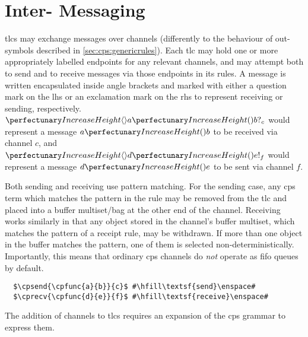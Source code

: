 \section{\label{sec:cps:intertlcmess}Inter- Messaging}

\Glspl{tlc} may exchange messages over channels (differently to the behaviour of out-symbols described in \cref{sec:cps:genericrules}).  Each \gls{tlc} may hold one or more appropriately labelled endpoints for any relevant channels, and may attempt both to send and to receive messages via those endpoints in its rules.  A message is written encapsulated inside angle brackets and marked with either a question mark on the \gls{lhs} or an exclamation mark on the \gls{rhs} to represent receiving or sending, respectively.  \Eg{} \(\cprecv{\cpfunc{a}{b}}{c}\) would represent a message \(\cpfunc{a}{b}\) to be received via channel \(c\), and \(\cpsend{\cpfunc{d}{e}}{f}\) would represent a message \(\cpfunc{d}{e}\) to be sent via channel \(f\).

Both sending and receiving use pattern matching.  For the sending case, any \gls{cps} term which matches the pattern in the rule may be removed from the \gls{tlc} and placed into a buffer multiset/bag at the other end of the channel.  Receiving works similarly in that any object stored in the channel's buffer multiset, which matches the pattern of a receipt rule, may be withdrawn.  If more than one object in the buffer matches the pattern, one of them is selected non-deterministically.  Importantly, this means that ordinary \gls{cps} channels do \emph{not} operate as \gls{fifo} queues by default.

\lstset{xleftmargin=.5in, xrightmargin=.5in} 
\begin{lstlisting}
  $\cpsend{\cpfunc{a}{b}}{c}$ #\hfill\textsf{send}\enspace#
  $\cprecv{\cpfunc{d}{e}}{f}$ #\hfill\textsf{receive}\enspace#
\end{lstlisting}

The addition of channels to \glspl{tlc} requires an expansion of the \gls{cps} grammar to express them.  

\begin{framed}
\vspace{-0.6cm}
\begin{small}
\begin{bnf*}
    \\
    \\
    \\
    \\
\end{bnf*}
\end{small}
\vspace{-0.8cm}
\end{framed}

